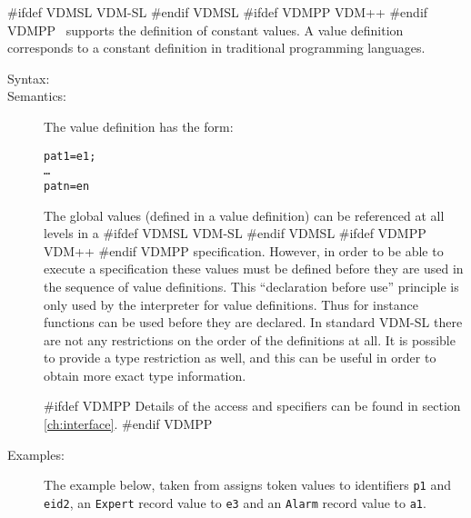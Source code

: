 \documentclass[\pformat,12pt]{article}
\newcommand{\vdmslpp}[2]{%
#ifdef VDMSL
#1
#endif VDMSL
#ifdef VDMPP
#2
#endif VDMPP
}
\newcommand{\vdmsl}{VDM-SL}
\newcommand{\vdmpp}{VDM++}
\begin{document}
\vdmslpp{\vdmsl}{\vdmpp}\ supports the definition of constant
values. A value definition corresponds to a constant definition in
traditional programming languages.

\begin{description}
\item[Syntax:]




\item[Semantics:] The value definition has the form:
  \begin{alltt}
       pat1 = e1;
      \ldots
       patn = en
  \end{alltt}

  
  The global values (defined in a value definition) can be referenced
  at all levels in a \vdmslpp{\vdmsl}{\vdmpp} specification.  However,
  in order to be able to execute a specification these 
  values must be defined before they are used in the sequence of value
  definitions. This ``declaration before use'' principle is only used
  by the interpreter for value definitions.
  Thus for instance functions can be used before they are declared. In
  standard VDM-SL there are not any restrictions on the order of the
  definitions at all. It is possible to provide a type restriction as
  well, and this can be useful in order to obtain more exact type
  information.

#ifdef VDMPP
Details of the access and  specifiers can be found in
section \ref{ch:interface}. 
#endif VDMPP

\item[Examples:] The example below, taken from \cite{Fitzgerald&98}
  assigns token values to identifiers  
  \texttt{p1} and \texttt{eid2}, an \texttt{Expert} record value to 
  \texttt{e3} and an \texttt{Alarm} record value to \texttt{a1}.
\begin{alltt}


\end{alltt}
\end{description}
\end{document}
